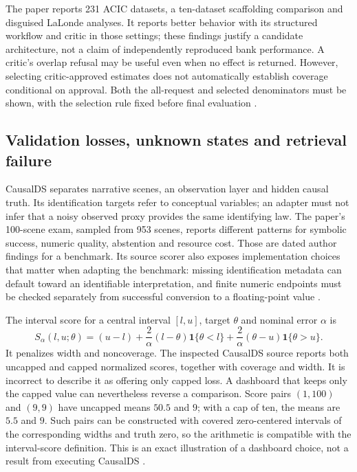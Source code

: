 The paper reports 231 ACIC datasets, a ten-dataset scaffolding comparison and
disguised LaLonde analyses. It reports better behavior with its structured
workflow and critic in those settings; these findings justify a candidate
architecture, not a claim of independently reproduced bank performance. A
critic's overlap refusal may be useful even when no effect is returned.
However, selecting critic-approved estimates does not automatically establish
coverage conditional on approval. Both the all-request and selected denominators
must be shown, with the selection rule fixed before final evaluation
\citep{v12_la_2607_22443}.

\subsection{Validation losses, unknown states and retrieval failure}

CausalDS separates narrative scenes, an observation layer and hidden causal
truth. Its identification targets refer to conceptual variables; an adapter must
not infer that a noisy observed proxy provides the same identifying law. The
paper's 100-scene exam, sampled from 953 scenes, reports different patterns for
symbolic success, numeric quality, abstention and resource cost. Those are dated
author findings for a benchmark. Its source scorer also exposes implementation
choices that matter when adapting the benchmark: missing identification metadata
can default toward an identifiable interpretation, and finite numeric endpoints
must be checked separately from successful conversion to a floating-point value
\citep{v12_la_2607_08093,exec14_estimation_sources}.

The interval score for a central interval $[l,u]$, target $\theta$ and nominal
error $\alpha$ is
\[
 S_\alpha(l,u;\theta)=(u-l)+\frac{2}{\alpha}(l-\theta)\mathbf1\{\theta<l\}
                  +\frac{2}{\alpha}(\theta-u)\mathbf1\{\theta>u\}.
\]
It penalizes width and noncoverage. The inspected CausalDS source reports both
uncapped and capped normalized scores, together with coverage and width. It is
incorrect to describe it as offering only capped loss. A dashboard that keeps
only the capped value can nevertheless reverse a comparison. Score pairs
$(1,100)$ and $(9,9)$ have uncapped means $50.5$ and $9$; with a cap of ten,
the means are $5.5$ and $9$. Such pairs can be constructed with covered
zero-centered intervals of the corresponding widths and truth zero, so the
arithmetic is compatible with the interval-score definition. This is an exact
illustration of a dashboard choice, not a result from executing CausalDS
\citep{exec14_estimation_sources,exec14_estimation_oracles}.

